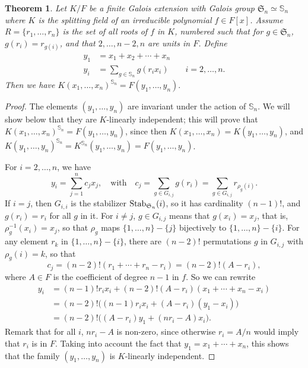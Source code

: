 \documentclass[12pt]{article}
\theoremstyle{plain}
\newtheorem{theorem}{Theorem}
\begin{document}
\begin{theorem}\label{specialcase}
  Let $K/F$ be a finite Galois extension with Galois group
  $\mathfrak{S}_n \simeq \mathbb{S}_n$ where $K$ is the splitting
  field of an irreducible polynomial $ f \in F[x]$. Assume $R =
  \lbrace r_1, \ldots, r_n \rbrace$ is the set of all roots of $f$ in
  $K$, numbered such that for $g \in \mathfrak{S}_n$, $g(r_i) =
  r_{g(i)}$, and that $2,\dots,n-2,n$ are units in $F$. Define
  \begin{align*}
    y_1 &=x_1+ x_2+ \cdots + x_n\\
    y_i &= \sum_{g\in \mathbb{S}_n} g(r_i x_i) \qquad i = 2, \ldots, n.
  \end{align*}
  Then we have $K(x_1, \ldots, x_n)^{\mathbb{S}_n} = F(y_1, \ldots, y_n).$
\end{theorem}
\begin{proof}
    The elements $(y_1,\dots,y_n)$ are invariant under the action of
    $\mathbb{S}_n$. We will show below that they are $K$-linearly independent;
    this will prove that $K(x_1,\dots,x_n)^{\mathbb{S}_n}=F(y_1,\dots,y_n)$, since
    then $K(x_1,\dots,x_n)=K(y_1,\dots,y_n)$, and
    $K(y_1,\dots,y_n)^{\mathbb{S}_n}=K^{\mathbb{S}_n}(y_1,\dots,y_n)=F(y_1,\dots,y_n)$.

    For $i=2,\dots,n$, we have
    $$y_i = \sum_{j=1}^n c_j x_j,\quad\text{with}\quad c_j = \sum_{g\in G_{i,j}} g(r_i)=\sum_{g\in G_{i,j}} r_{\rho_g(i)}.$$
    If $i=j$, then $G_{i,i}$ is the stabilizer ${\rm Stab}_{\mathfrak{S}_n}(i)$,
    so it has cardinality $(n-1)!$, and $g(r_i)=r_i$ for all $g$ in it.
    For $i \ne j$, $g \in G_{i,j}$ means that $g(x_i)=x_j$, that is,
    $\rho_{g}^{-1}(x_i)=x_j$, so that $\rho_g$ maps $\{1,\dots,n\}-\{j\}$
    bijectively to $\{1,\dots,n\}-\{i\}$. For any element $r_k$ in $\{1,\dots,n\}-\{i\}$,
    there are $(n-2)!$ permutations $g$ in $G_{i,j}$ with $\rho_g(i)=k$, so that
    $$c_j = (n-2)! (r_1 +\cdots +r_n -r_i) = (n-2)!(A-r_i),$$
    where $A\in F$ is the coefficient of degree $n-1$ in $f$. So we can rewrite
    \begin{align*}
    y_i &= (n-1)! r_i x_i + (n-2)! (A-r_i)(x_1 + \cdots +x_n -x_i)\\      
&= (n-2)! \big ( (n-1) r_i x_i + (A-r_i)(y_1-x_i) \big )\\
    &= (n-2)! \big( (A-r_i) y_1 + ( nr_i -A)x_i \big ).
    \end{align*}
    Remark that for all $i$, $nr_i-A$ is non-zero, since otherwise 
    $r_i=A/n$ would imply that $r_i$ is in $F$. Taking into account the fact that 
    $y_1=x_1 +\cdots +x_n$, this shows that 
    the family $(y_1,\dots,y_n)$ is $K$-linearly independent.
\end{proof}
\end{document}
